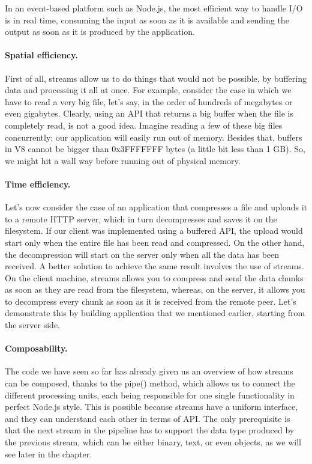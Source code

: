 \documentclass{llncs}
\begin{document}
In an event-based platform such as Node.js, the most efficient way to handle I/O is in real time, consuming the input as soon as it is available and sending the output as soon as it is produced by the application.

\paragraph{Spatial efficiency.}
First of all, streams allow us to do things that would not be possible, by buffering data and processing it all at once. For example, consider the case in which we have to read a very big file, let's say, in the order of hundreds of megabytes or even gigabytes. 
Clearly, using an API that returns a big buffer when the file is completely read, is not a good idea.
Imagine reading a few of these big files concurrently; our application will easily run out of memory. Besides that, buffers in V8 cannot be bigger than 0x3FFFFFFF bytes (a little bit less than 1 GB). 
So, we might hit a wall way before running out of physical memory.

\paragraph{Time efficiency.}
Let's now consider the case of an application that compresses a file and uploads it to a remote HTTP server, which in turn decompresses and saves it on the filesystem.
If our client was implemented using a buffered API, the upload would start only when the entire file has been read and compressed. On the other hand, the decompression will start on the server only when all the data has been received. 
A better solution to achieve the same result involves the use of streams. 
On the client machine, streams allows you to compress and send the data chunks as soon as they are read from the filesystem, whereas, on the server, it allows you to decompress every chunk as soon as it is received from the remote peer. 
Let's demonstrate this by building application that we mentioned earlier, starting from the server side.

\paragraph{Composability.}
The code we have seen so far has already given us an overview of how streams can be composed, thanks to the pipe() method, which allows us to connect the different processing units, each being responsible for one single functionality in perfect Node.js style. 
This is possible because streams have a uniform interface, and they can understand each other in terms of API. The only prerequisite is that the next stream in the pipeline has to support the data type produced by the previous stream, which can be either binary, text, or even objects, as we will see later in the chapter.
\end{document}
